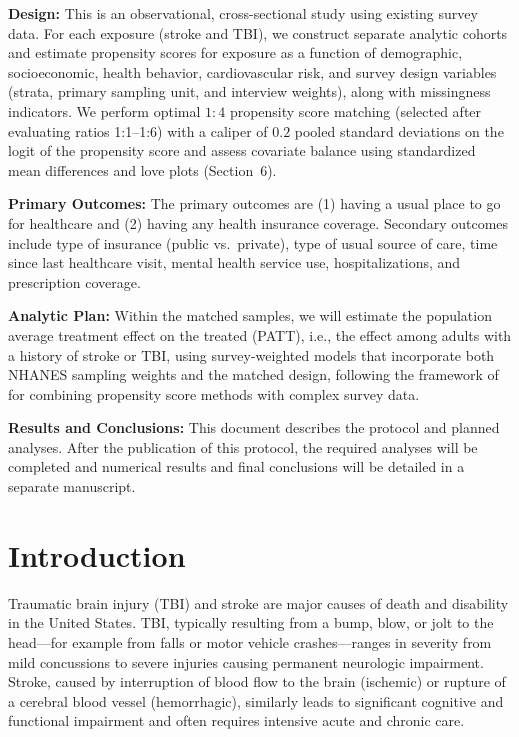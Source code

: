 \documentclass{article}
\begin{document}
\textbf{Design:} This is an observational, cross-sectional study using existing survey data. For each exposure (stroke and TBI), we construct separate analytic cohorts and estimate propensity scores for exposure as a function of demographic, socioeconomic, health behavior, cardiovascular risk, and survey design variables (strata, primary sampling unit, and interview weights), along with missingness indicators. We perform optimal $1\!:\!4$ propensity score matching (selected after evaluating ratios 1:1--1:6) with a caliper of $0.2$ pooled standard deviations on the logit of the propensity score and assess covariate balance using standardized mean differences and love plots (Section~6).

\textbf{Primary Outcomes:} The primary outcomes are (1) having a usual place to go for healthcare and (2) having any health insurance coverage. Secondary outcomes include type of insurance (public vs.\ private), type of usual source of care, time since last healthcare visit, mental health service use, hospitalizations, and prescription coverage.

\textbf{Analytic Plan:} Within the matched samples, we will estimate the population average treatment effect on the treated (PATT), i.e., the effect among adults with a history of stroke or TBI, using survey-weighted models that incorporate both NHANES sampling weights and the matched design, following the framework of \citet{dugoff2014} for combining propensity score methods with complex survey data.

\textbf{Results and Conclusions:} This document describes the protocol and planned analyses. After the publication of this protocol, the required analyses will be completed and numerical results and final conclusions will be detailed in a separate manuscript.

\section{Introduction}

Traumatic brain injury (TBI) and stroke are major causes of death and disability in the United States. TBI, typically resulting from a bump, blow, or jolt to the head---for example from falls or motor vehicle crashes---ranges in severity from mild concussions to severe injuries causing permanent neurologic impairment. Stroke, caused by interruption of blood flow to the brain (ischemic) or rupture of a cerebral blood vessel (hemorrhagic), similarly leads to significant cognitive and functional impairment and often requires intensive acute and chronic care.
\end{document}
